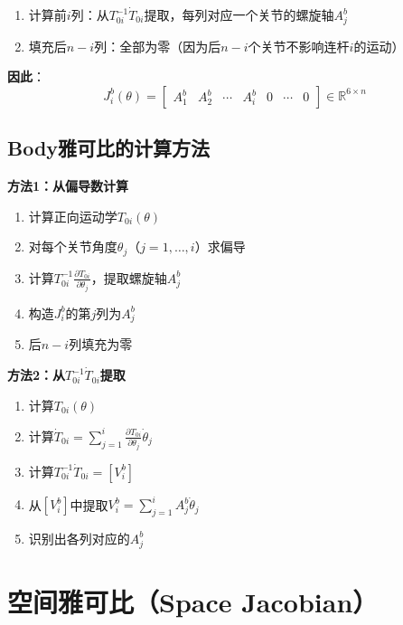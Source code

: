 \documentclass[12pt,a4paper]{article}
\begin{document}
\begin{enumerate}
\item 计算前$i$列：从$T_{0i}^{-1}\dot{T}_{0i}$提取，每列对应一个关节的螺旋轴$A_j^b$
\item 填充后$n-i$列：全部为零（因为后$n-i$个关节不影响连杆$i$的运动）
\end{enumerate}

\textbf{因此}：
\begin{equation}
J_i^b(\theta) = \begin{bmatrix} A_1^b & A_2^b & \cdots & A_i^b & 0 & \cdots & 0 \end{bmatrix} \in \mathbb{R}^{6 \times n}
\label{eq:body_jacobian_full}
\end{equation}

\subsection{Body雅可比的计算方法}

\textbf{方法1：从偏导数计算}

\begin{enumerate}
\item 计算正向运动学$T_{0i}(\theta)$
\item 对每个关节角度$\theta_j$（$j = 1, \ldots, i$）求偏导
\item 计算$T_{0i}^{-1} \frac{\partial T_{0i}}{\partial \theta_j}$，提取螺旋轴$A_j^b$
\item 构造$J_i^b$的第$j$列为$A_j^b$
\item 后$n-i$列填充为零
\end{enumerate}

\textbf{方法2：从$T_{0i}^{-1}\dot{T}_{0i}$提取}

\begin{enumerate}
\item 计算$T_{0i}(\theta)$
\item 计算$\dot{T}_{0i} = \sum_{j=1}^{i} \frac{\partial T_{0i}}{\partial \theta_j} \dot{\theta}_j$
\item 计算$T_{0i}^{-1} \dot{T}_{0i} = [V_i^b]$
\item 从$[V_i^b]$中提取$V_i^b = \sum_{j=1}^{i} A_j^b \dot{\theta}_j$
\item 识别出各列对应的$A_j^b$
\end{enumerate}

\section{空间雅可比（Space Jacobian）}
\end{document}
